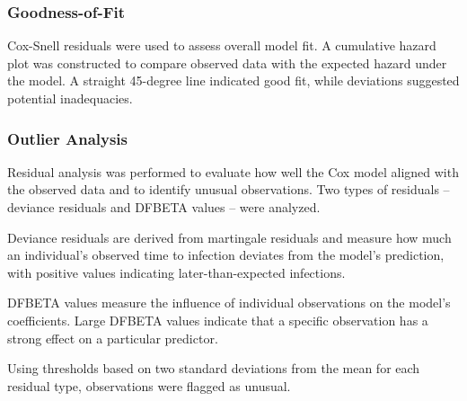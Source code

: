 \documentclass[12pt]{article}
\begin{document}
\subsubsection{\texorpdfstring{\textbf{Goodness-of-Fit}}{Goodness-of-Fit}}\label{goodness-of-fit}

Cox-Snell residuals were used to assess overall model fit. A cumulative
hazard plot was constructed to compare observed data with the expected
hazard under the model. A straight 45-degree line indicated good fit,
while deviations suggested potential inadequacies.

\subsubsection{\texorpdfstring{\textbf{Outlier
Analysis}}{Outlier Analysis}}\label{outlier-analysis}

Residual analysis was performed to evaluate how well the Cox model
aligned with the observed data and to identify unusual observations. Two
types of residuals -- deviance residuals and DFBETA values -- were
analyzed.

Deviance residuals are derived from martingale residuals and measure how
much an individual's observed time to infection deviates from the
model's prediction, with positive values indicating later-than-expected
infections.

DFBETA values measure the influence of individual observations on the
model's coefficients. Large DFBETA values indicate that a specific
observation has a strong effect on a particular predictor.

Using thresholds based on two standard deviations from the mean for each
residual type, observations were flagged as unusual.



\end{document}
